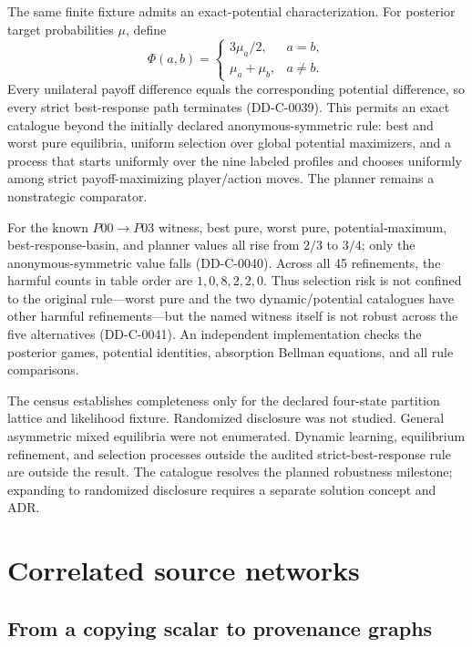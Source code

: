 \documentclass[11pt]{article}
\theoremstyle{remark}
\begin{document}
The same finite fixture admits an exact-potential characterization. For posterior
target probabilities $\mu$, define
\[
\Phi(a,b)=
\begin{cases}
3\mu_a/2,&a=b,\\
\mu_a+\mu_b,&a\ne b.
\end{cases}
\]
Every unilateral payoff difference equals the corresponding potential difference,
so every strict best-response path terminates (DD-C-0039). This permits an exact
catalogue beyond the initially declared anonymous-symmetric rule: best and worst
pure equilibria, uniform selection over global potential maximizers, and a process
that starts uniformly over the nine labeled profiles and chooses uniformly among
strict payoff-maximizing player/action moves. The planner remains a nonstrategic
comparator.



For the known $P00\to P03$ witness, best pure, worst pure, potential-maximum,
best-response-basin, and planner values all rise from $2/3$ to $3/4$; only the
anonymous-symmetric value falls (DD-C-0040). Across all 45 refinements, the harmful
counts in table order are $1,0,8,2,2,0$. Thus selection risk is not confined to the
original rule---worst pure and the two dynamic/potential catalogues have other
harmful refinements---but the named witness itself is not robust across the five
alternatives (DD-C-0041). An independent implementation checks the posterior
games, potential identities, absorption Bellman equations, and all rule comparisons.

The census establishes completeness only for the declared four-state partition
lattice and likelihood fixture. Randomized disclosure was not studied. General
asymmetric mixed equilibria were not enumerated. Dynamic learning, equilibrium
refinement, and selection processes outside the audited strict-best-response rule
are outside the result. The catalogue resolves the planned robustness milestone;
expanding to randomized disclosure requires a separate solution concept and ADR.

\section{Correlated source networks}
\subsection{From a copying scalar to provenance graphs}
\end{document}
